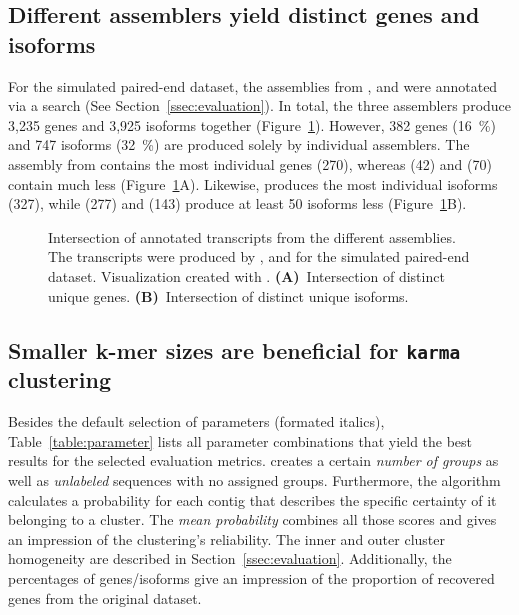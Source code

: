 \documentclass[12pt,a4paper,english]{article}
\begin{document}
	\subsection{Different assemblers yield distinct genes and isoforms}
	For the simulated paired-end dataset, the assemblies from \spades, \trinity and \soap were annotated via a \blast search (See Section~\ref{ssec:evaluation}).
	In total, the three assemblers produce 3,235 genes and 3,925 isoforms together (Figure~\ref{img:difference}).
	However, 382 genes (16~\%) and 747 isoforms (32~\%) are produced solely by individual assemblers. The assembly from \spades contains the most individual genes (270), whereas \trinity (42) and \soap (70) contain much less (Figure~\ref{img:difference}A). Likewise, \spades produces the most individual isoforms (327), while \soap (277) and \trinity (143) produce at least 50 isoforms less (Figure~\ref{img:difference}B). 
	\begin{figure}[H]
		\def\svgwidth{\textwidth}
		
		\caption[Intersection of annotated transcripts from the different assemblies.]{Intersection of annotated transcripts from the different assemblies. The transcripts were produced by \spades, \soap and \trinity for the simulated paired-end \celegans dataset. Visualization created with \intervene \citep{intervene:17}. \textbf{(A)}~Intersection of distinct unique genes. \textbf{(B)}~Intersection of distinct unique isoforms.}
		\label{img:difference}
	\end{figure}
	
	\subsection{Smaller k-mer sizes are beneficial for \texttt{karma} clustering}
	\label{ssec:parameter}
	
	Besides the default selection of parameters (formated italics), Table~\ref{table:parameter} lists all parameter combinations that yield the best results for the selected evaluation metrics.
	\hdbscan creates a certain \textit{number of groups} as well as \textit{unlabeled} sequences with no assigned groups. Furthermore, the algorithm calculates a probability for each contig that describes the specific certainty of it belonging to a cluster. The \textit{mean probability} combines all those scores and gives an impression of the clustering's reliability. The inner and outer cluster homogeneity are described in Section~\ref{ssec:evaluation}. Additionally, the percentages of genes/isoforms give an impression of the proportion of recovered genes from the original dataset.
	
\end{document}
